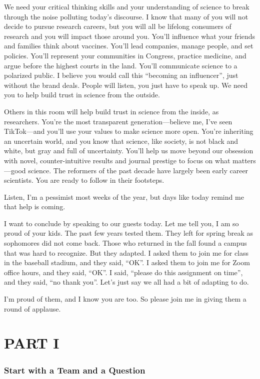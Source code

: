 \documentclass[
  letterpaper,
  DIV=11,
  numbers=noendperiod,
  oneside]{scrreprt}
\begin{document}
We need your critical thinking skills and your understanding of science
to break through the noise polluting today's discourse. I know that many
of you will not decide to pursue research careers, but you will all be
lifelong consumers of research and you will impact those around you.
You'll influence what your friends and families think about vaccines.
You'll lead companies, manage people, and set policies. You'll represent
your communities in Congress, practice medicine, and argue before the
highest courts in the land. You'll communicate science to a polarized
public. I believe you would call this ``becoming an influencer'', just
without the brand deals. People will listen, you just have to speak up.
We need you to help build trust in science from the outside.

Others in this room will help build trust in science from the inside, as
researchers. You're the most transparent generation---believe me, I've
seen TikTok---and you'll use your values to make science more open.
You're inheriting an uncertain world, and you know that science, like
society, is not black and white, but gray and full of uncertainty.
You'll help us move beyond our obsession with novel, counter-intuitive
results and journal prestige to focus on what matters---good science.
The reformers of the past decade have largely been early career
scientists. You are ready to follow in their footsteps.

Listen, I'm a pessimist most weeks of the year, but days like today
remind me that help is coming.

I want to conclude by speaking to our guests today. Let me tell you, I
am so proud of your kids. The past few years tested them. They left for
spring break as sophomores did not come back. Those who returned in the
fall found a campus that was hard to recognize. But they adapted. I
asked them to join me for class in the baseball stadium, and they said,
``OK''. I asked them to join me for Zoom office hours, and they said,
``OK''. I said, ``please do this assignment on time'', and they said,
``no thank you''. Let's just say we all had a bit of adapting to do.

I'm proud of them, and I know you are too. So please join me in giving
them a round of applause.

\part{PART I}

\hypertarget{start-with-a-team-and-a-question}{%
\section*{Start with a Team and a
Question}\label{start-with-a-team-and-a-question}}
\end{document}
